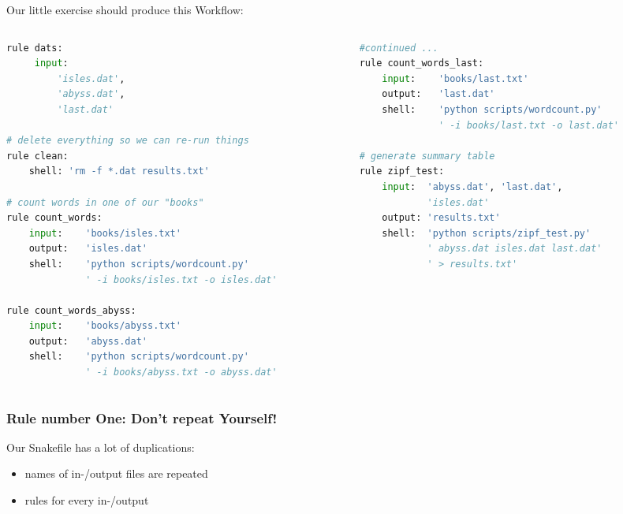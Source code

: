 \begin{frame}[fragile]
Our little exercise should produce this Workflow:
  \begin{columns}
    \begin{column}{0.5\textwidth}
      \begin{lstlisting}[language=Python,style=Python, basicstyle=\tiny]
rule dats:
     input:
         'isles.dat',
         'abyss.dat',
         'last.dat'

# delete everything so we can re-run things
rule clean:
    shell: 'rm -f *.dat results.txt'

# count words in one of our "books"
rule count_words:
    input:    'books/isles.txt'
    output:   'isles.dat'
    shell:    'python scripts/wordcount.py'
              ' -i books/isles.txt -o isles.dat'

rule count_words_abyss:
    input:    'books/abyss.txt'
    output:   'abyss.dat'
    shell:    'python scripts/wordcount.py' 
              ' -i books/abyss.txt -o abyss.dat'
      \end{lstlisting}
    \end{column}
    \begin{column}{0.5\textwidth}
      \begin{lstlisting}[language=Python,style=Python, basicstyle=\tiny]
#continued ...
rule count_words_last:
    input:    'books/last.txt'
    output:   'last.dat'
    shell:    'python scripts/wordcount.py'
              ' -i books/last.txt -o last.dat'
              
# generate summary table
rule zipf_test:
    input:  'abyss.dat', 'last.dat', 
            'isles.dat'
    output: 'results.txt'
    shell:  'python scripts/zipf_test.py' 
            ' abyss.dat isles.dat last.dat'
            ' > results.txt'
      \end{lstlisting}
    \end{column}
  \end{columns}
\end{frame}

\begin{frame}
  \frametitle{Rule number One: Don't repeat Yourself!}

Our Snakefile has a lot of duplications: 
\begin{itemize}
 \item names of in-/output files are repeated
 \item rules for every in-/output
\end{itemize}
\end{frame}

